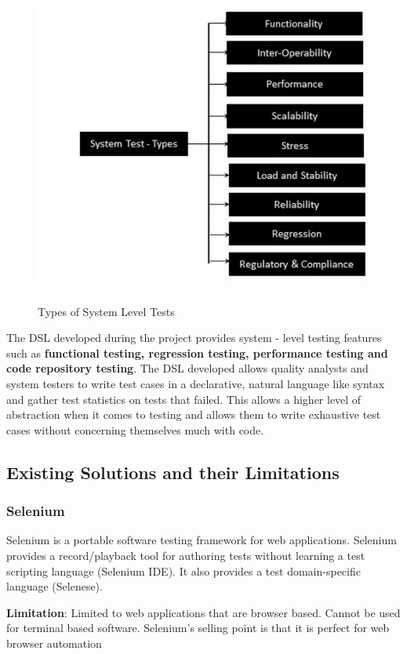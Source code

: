 \begin{figure}[H]
  \centering
    \includegraphics[height=400px]{figures/system_testing_types.png}
  \caption{Types of System Level Tests}
\end{figure}

\noindent
The DSL developed during the project provides system - level testing features such as \textbf{functional testing, regression testing, performance testing and code repository testing}. The DSL developed allows quality analysts and system testers to write test cases in a declarative, natural language like syntax and gather test statistics on tests that failed. This allows a higher level of abstraction when it comes to testing and allows them to write exhaustive test cases without concerning themselves much with code.
\newpage

\subsection{Existing Solutions and their Limitations}

\subsubsection{Selenium}
Selenium is a portable software testing framework for web applications. Selenium provides a record/playback tool for authoring tests without learning a test scripting language (Selenium IDE). It also provides a test domain-specific language (Selenese).
\bigskip

\noindent
\textbf{Limitation}: Limited to web applications that are browser based. Cannot be used for terminal based software. Selenium's selling point is that it is perfect for web browser automation

